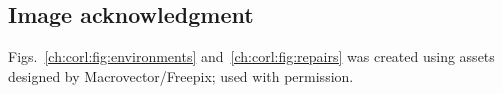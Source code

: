 \documentclass[twoside]{mitthesis} %
\begin{document}


\tableofcontents
\listoffigures
\listoftables



\doublespacing










\appendix





\singlespacing

\printbibliography[title={References},heading=bibintoc]

\subsection*{Image acknowledgment}
Figs.~\ref{ch:corl:fig:environments} and~\ref{ch:corl:fig:repairs} was created using assets designed by Macrovector/Freepix; used with permission.





%
%
\end{document}
